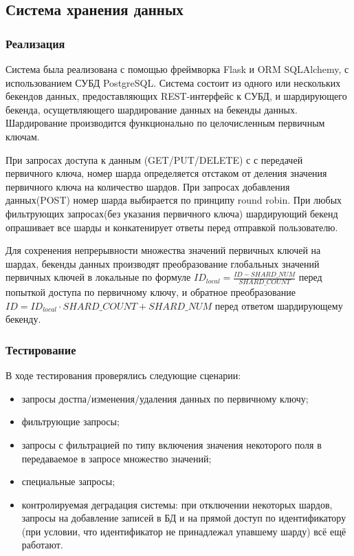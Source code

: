 \documentclass[a4paper,12pt]{report}
\numberwithin{equation}{section}
\begin{document}
  \subsection{Система хранения данных}
  \subsubsection{Реализация}
  Система была реализована с помощью фреймворка Flask и ORM SQLAlchemy, с использованием СУБД PostgreSQL.
  Система состоит из одного или нескольких бекендов данных, предоставляющих REST-интерфейс к СУБД, и шардирующего бекенда, осущетвляющего шардирование
  данных на бекенды данных. Шардирование производится функционально по целочисленным первичным ключам.
  
  
  При запросах доступа к данным (GET/PUT/DELETE) с
  с передачей первичного ключа, номер шарда определяется отстаком от деления значения первичного ключа на количество шардов. При запросах добавления данных(POST)
  номер шарда выбирается по принципу round robin. При любых фильтрующих запросах(без указания первичного ключа) шардирующий бекенд опрашивает все шарды и 
  конкатенирует ответы перед отправкой пользователю. 
  
  
  Для сохренения непрерывности множества значений первичных ключей на шардах, бекенды данных производят преобразование глобальных значений первичных ключей
  в локальные по формуле $ID_{local} = \frac{ID - SHARD\_NUM}{SHARD\_COUNT}$ перед попыткой доступа по первичному ключу, и обратное преобразование 
  $ID = ID_{local} \cdot SHARD\_COUNT + SHARD\_NUM$ перед ответом шардирующему бекенду.
  
  \subsubsection{Тестирование}
  В ходе тестирования проверялись следующие сценарии:
  
  \begin{itemize}
    \item запросы достпа/изменения/удаления данных по первичному ключу;
    \item фильтрующие запросы;
    \item запросы с фильтрацией по типу включения значения некоторого поля в передаваемое в запросе множество значений;
    \item специальные запросы;
    \item контролируемая деградация системы: при отключении некоторых шардов, запросы на добавление записей в БД и на прямой доступ по идентификатору (при условии, что идентификатор не принадлежал упавшему шарду) всё ещё работают.
  \end{itemize}
  
\end{document}
